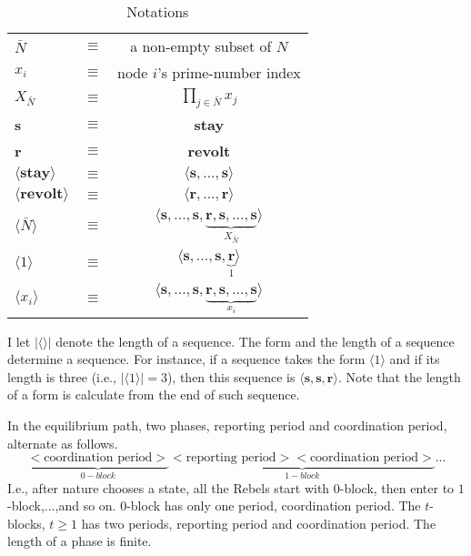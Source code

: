 \documentclass[12pt,letterpaper]{article}
\theoremstyle{definition}
\theoremstyle{remark}
\theoremstyle{claim}
\begin{document}
\begin{table}[t]
\caption{Notations}
\label{Table_msg_form}
\begin{center}
\begin{tabular}{l c c}
$\bar{N}$ 										& $\equiv$ 			& a non-empty subset of $N$  \\
$x_i$ 											& $\equiv$ 			& node $i$'s prime-number index  \\
$X_{\bar{N}}$ 								& $\equiv$ 			& $\prod_{j\in \bar{N}}x_j$  \\
\textbf{s}										& $\equiv$ 			& \textbf{stay}  \\
\textbf{r}										& $\equiv$ 			& \textbf{revolt}  \\
$\langle \textbf{stay} \rangle$ 		& $\equiv$ 			& $\langle \textbf{s},...,\textbf{s}\rangle$  \\
$\langle \textbf{revolt} \rangle$ 	& $\equiv$ 			& $\langle \textbf{r},...,\textbf{r}\rangle$  \\
$\langle  \bar{N} \rangle$ 				& $\equiv$ 			& $\langle \textbf{s},...,\textbf{s},\underbrace{\textbf{r},\textbf{s},...,\textbf{s}}_{X_{ \bar{N}}}\rangle$  \\

$\langle 1 \rangle$	 					& $\equiv$ 			& $\langle \textbf{s},...,\textbf{s},\underbrace{\textbf{r}}_{1}\rangle$  \\
$\langle x_i \rangle$	 	& $\equiv$ 			& $\langle \textbf{s},...,\textbf{s},\underbrace{\textbf{r},\textbf{s},...,\textbf{s}}_{x_i}\rangle$  \\
\end{tabular}
\end{center}
\end{table}

I let $|\langle\rangle|$ denote the length of a sequence. The form and the length of a sequence determine a sequence. For instance, if a sequence takes the form $\langle 1 \rangle$ and if its length is three (i.e., $|\langle 1 \rangle|=3$), then this sequence is $\langle \textbf{s},\textbf{s},\textbf{r}\rangle$. Note that the length of a form is calculate from the end of such sequence.

In the equilibrium path, two phases, {reporting period} and {coordination period}, alternate as follows.
\[\underbrace{<\text{coordination period}>}_{0-block}\underbrace{<\text{reporting period}><\text{coordination period}>}_{1-block}...\]
I.e., after nature chooses a state, all the Rebels start with $0$-block, then enter to $1$-block,...,and so on. $0$-block has only one period, coordination period. The $t$-blocks, $t\geq 1$ has two periods, reporting period and coordination period. The length of a phase is finite.
\end{document}
